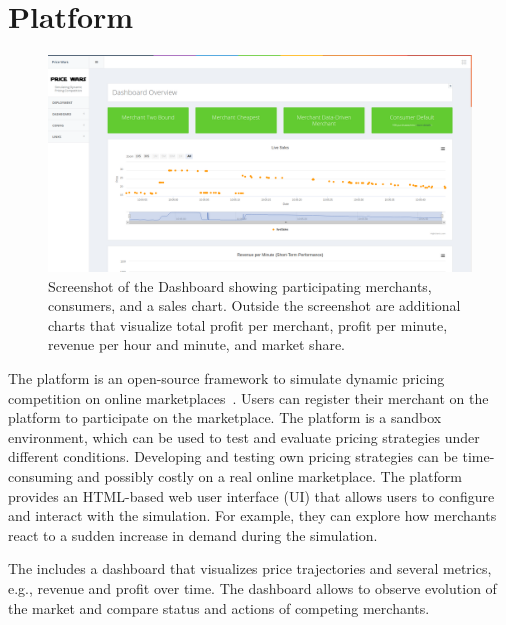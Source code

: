
\chapter{\pricewars Platform}

\begin{figure}[h]
	\centering
	\includegraphics[width=\textwidth]{figures/dashboard}
	\caption[Screenshot of the \pricewars Dashboard]{Screenshot of the \pricewars Dashboard showing participating merchants, consumers, and a sales chart. Outside the screenshot are additional charts that visualize total profit per merchant, profit per minute, revenue per hour and minute, and market share.}
	\label{fig:dashboard}
\end{figure}


The \pricewars platform is an open-source framework to simulate dynamic pricing competition on online marketplaces~\cite{DBLP:conf/recsys/0001SPSBLLSU17, edoc2017pricewars}.
Users can register their merchant on the platform to participate on the marketplace.
The platform is a sandbox environment, which can be used to test and evaluate pricing strategies under different conditions.
Developing and testing own pricing strategies can be time-consuming and possibly costly on a real online marketplace.
The platform provides an HTML-based web user interface (UI) that allows users to configure and interact with the simulation.
For example, they can explore how merchants react to a sudden increase in demand during the simulation.

The \ui includes a dashboard that visualizes price trajectories and several metrics, e.g., revenue and profit over time.
The dashboard allows to observe evolution of the market and compare status and actions of competing merchants.

